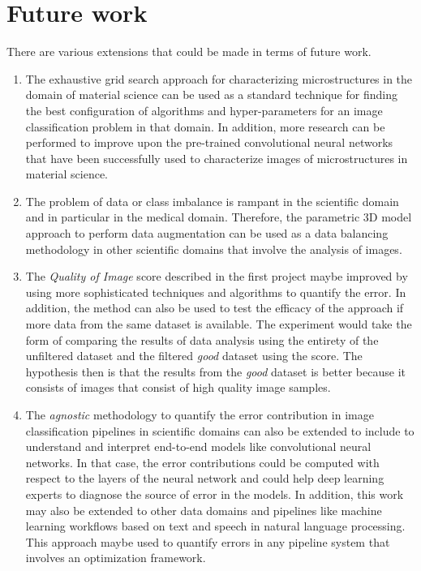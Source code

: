 \section{Future work}
There are various extensions that could be made in terms of future work.
\begin{enumerate}

\item The exhaustive grid search approach for characterizing microstructures in the domain of material science can be used as a standard technique for finding the best configuration of algorithms and hyper-parameters for an image classification problem in that domain. In addition, more research can be performed to improve upon the pre-trained convolutional neural networks that have been successfully used to characterize images of microstructures in material science.
\item The problem of data or class imbalance is rampant in the scientific domain and in particular in the medical domain. Therefore, the parametric 3D model approach to perform data augmentation can be used as a data balancing methodology in other scientific domains that involve the analysis of images. 
\item The \textit{Quality of Image} score described in the first project maybe improved by using more sophisticated techniques and algorithms to quantify the error. In addition, the method can also be used to test the efficacy of the approach if more data from the same dataset is available. The experiment would take the form of comparing the results of data analysis using the entirety of the unfiltered dataset and the filtered \textit{good} dataset using the score. The hypothesis then is that the results from the \textit{good} dataset is better because it consists of images that consist of high quality image samples.

\item The \textit{agnostic} methodology to quantify the error contribution in image classification pipelines in scientific domains can also be extended to include to understand and interpret end-to-end models like convolutional neural networks. In that case, the error contributions could be computed with respect to the layers of the neural network and could help deep learning experts to diagnose the source of error in the models. In addition, this work may also be extended to other data domains and pipelines like machine learning workflows based on text and speech in natural language processing. This approach maybe used to quantify errors in any pipeline system that involves an optimization framework. 

\end{enumerate}